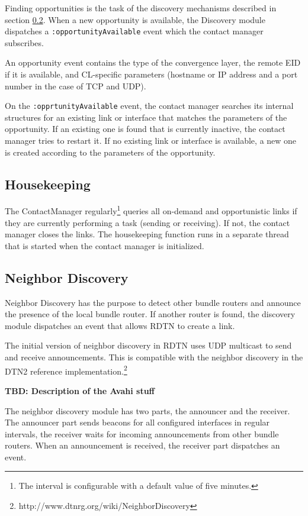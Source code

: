 \documentclass{article}
\begin{document}
Finding opportunities is the task of the discovery mechanisms described in
section \ref{sec.discovery}.  When a new opportunity is available, the Discovery
module dispatches a {\tt :opportunityAvailable} event which the contact manager
subscribes.

An opportunity event contains the type of the convergence layer, the remote EID
if it is available, and CL-specific parameters (hostname or IP address and a
port number in the case of TCP and UDP).

On the {\tt :opprtunityAvailable} event, the contact manager searches its
internal structures for an existing link or interface that matches the
parameters of the opportunity. If an existing one is found that is currently
inactive, the contact manager tries to restart it. If no existing link or
interface is available, a new one is created according to the parameters of the
opportunity.

\subsection{Housekeeping}

The ContactManager regularly\footnote{The interval is configurable with a
default value of five minutes.} queries all on-demand and opportunistic links if
they are currently performing a task (sending or receiving). If not, the contact
manager closes the links.  The housekeeping function runs in a separate thread
that is started when the contact manager is initialized.

\subsection{Neighbor Discovery}\label{sec.discovery}

Neighbor Discovery has the purpose to detect other bundle routers and announce
the presence of the local bundle router. If another router is found, the
discovery module dispatches an event that allows RDTN to create a link.

The initial version of neighbor discovery in RDTN uses UDP multicast to send and
receive announcements. This is compatible with the neighbor discovery in the
DTN2 reference
implementation.\footnote{http://www.dtnrg.org/wiki/NeighborDiscovery} 

{\bf TBD: Description of the Avahi stuff}

The neighbor discovery module has two parts, the announcer and the receiver. The
announcer part sends beacons for all configured interfaces in regular intervals,
the receiver waits for incoming announcements from other bundle routers. When an
announcement is received, the receiver part dispatches an event.
\end{document}
